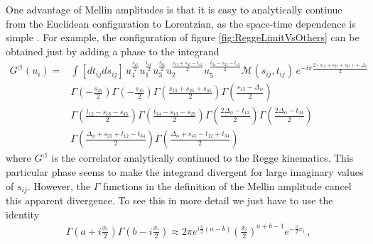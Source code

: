 One advantage of Mellin amplitudes is that it is easy to analytically continue from the Euclidean configuration to Lorentzian, as the space-time dependence is simple \cite{Mack:2009mi}.  For example, the configuration
of figure \ref{fig:ReggeLimitVsOthers} can be obtained just by adding a phase to the integrand \cite{Costa:2012cb}
\begin{align}
  \label{eq:MellinAmpDefinition}
  G^{\circlearrowleft} (u_i) = & \int [dt_{ij}ds_{ij}] \,u_4^{\frac{s_{45}}{2}} u_1^{\frac{t_{12}}{2}} u_3^{\frac{t_{34}}{2}} u_2^{\frac{s_{13}+s_{45}-t_{12}}{2} } u_5^{\frac{t_{34}-s_{25}-t_{12}}{2}} \mathcal{M}(s_{ij},t_{ij})
  \,e^{ -i\pi\frac{2 \left(s_{13}+s_{25}+s_{45}\right)+\Delta_{\phi} }{2}   }\nonumber                                                                                                                                                                          \\
                               & \Gamma \!\left(-\frac{s_{25}}{2}\right) \Gamma \!\left(-\frac{s_{45}}{2}\right) \Gamma \!\left(\frac{s_{13}+s_{25}+s_{45}}{2} \right) \Gamma \!\left(\frac{s_{13}-\Delta_\phi }{2}  \right)                                    \\
                               & \Gamma \!\left(\frac{t_{12}-s_{13}-s_{45}}{2} \right) \Gamma \!\left(\frac{t_{34}-s_{13}-s_{25}}{2} \right) \Gamma \!\left( \frac{2\Delta_\phi-t_{12}}{2}\right) \Gamma \!\left(\frac{2\Delta_\phi-t_{34}}{2}\right) \nonumber \\
                               & \Gamma \!\left(\frac{\Delta_\phi +s_{25}+t_{12}-t_{34}}{2} \right) \Gamma \!\left(\frac{\Delta_\phi +s_{45}-t_{12}+t_{34}}{2} \right) 
  \nonumber
\end{align}
where $G^{\circlearrowleft} $ is the correlator analytically continued to the Regge kinematics. 
This particular phase seems to make the integrand divergent for large imaginary values of $s_{ij}$. However, the $\Gamma$ functions in the definition of the Mellin amplitude cancel this apparent divergence.  To see this in more detail we just have to use the identity
\begin{align}
   & \Gamma\left(a+i\frac{x_i}{2}\right)\Gamma\left(b-i\frac{x_i}{2}\right) \approx 2\pi e^{i\frac{\pi}{2}(a-b)} \left(\frac{x_i}
  {2}\right)^{a+b-1}e^{-\frac{\pi}{2}x_i} \,,
\end{align}
